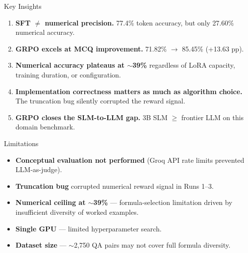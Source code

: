 \documentclass[10pt]{beamer}
\begin{document}
\begin{frame}{Key Insights}
\large
\begin{enumerate}
    \item \textbf{SFT $\neq$ numerical precision.} 77.4\% token accuracy, but only 27.60\% numerical accuracy.
    \vspace{0.2cm}

    \item \textbf{GRPO excels at MCQ improvement.} 71.82\% $\to$ 85.45\% (+13.63 pp).
    \vspace{0.2cm}

    \item \textbf{Numerical accuracy plateaus at $\sim$39\%} regardless of LoRA capacity, training duration, or configuration.
    \vspace{0.2cm}

    \item \textbf{Implementation correctness matters as much as algorithm choice.} The truncation bug silently corrupted the reward signal.
    \vspace{0.2cm}

    \item \textbf{GRPO closes the SLM-to-LLM gap.} 3B SLM $\geq$ frontier LLM on this domain benchmark.
\end{enumerate}
\end{frame}

\begin{frame}{Limitations}
\large
\begin{itemize}
    \item \textbf{Conceptual evaluation not performed} (Groq API rate limits prevented LLM-as-judge).
    \vspace{0.2cm}
    \item \textbf{Truncation bug} corrupted numerical reward signal in Runs 1--3.
    \vspace{0.2cm}
    \item \textbf{Numerical ceiling at $\sim$39\%} — formula-selection limitation driven by insufficient diversity of worked examples.
    \vspace{0.2cm}
    \item \textbf{Single GPU} — limited hyperparameter search.
    \vspace{0.2cm}
    \item \textbf{Dataset size} — $\sim$2,750 QA pairs may not cover full formula diversity.
\end{itemize}
\end{frame}
\end{document}
